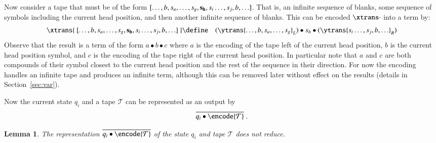 \documentclass[submission,copyright,creativecommons]{eptcs}
\newtheorem{lemma}[theorem]{Lemma}
\newcommand{\oan}[1]{\overline{#1}}
\newcommand{\tape}[1]{[#1]}
\begin{document}
Now consider a tape that must be of the form
$\tape{\ldots,b,s_a,\ldots,s_g,{\bf s_h},s_i\ldots,s_j,b,\ldots}$.
That is, an infinite sequence of blanks, some sequence of symbols including the current
head position, and then another infinite sequence of blanks.
This can be encoded $\xtrans\cdot$ into a term by:
\begin{eqnarray*}
\xtrans{\ \tape{\ldots,b,s_a,\ldots,s_g,{\bf s_h},s_i\ldots,s_j,b,\ldots}\ }
&\define&
(\ytrans{\ldots,b,s_a,\ldots,s_g}_L)\bullet s_h\bullet (\ytrans {s_i\ldots,s_j,b,\ldots}_R)
\end{eqnarray*}
{
Observe that the result is a term of the form $a\bullet b\bullet c$
where $a$ is the encoding of the tape left of the current head position,
$b$ is the current head position symbol,
and $c$ is the encoding of the tape right of the current head position.
In particular note that $a$ and $c$ are both compounds of their symbol closest
to the current head position and the rest of the sequence in their direction.
}
For now the encoding handles an infinite tape and produces an infinite term,
although this can be removed later without effect on the results (details in Section~\ref{sec:var}).


Now the current state $q_i$ and a tape ${\mathcal T}$ can be represented as an output by
\begin{equation*}
\oan {q_i\bullet \encode {\mathcal T}}\; .
\end{equation*}

\begin{lemma}
\label{lem:tape-no-red}
The representation $\oan {q_i\bullet \encode {\mathcal T}}$ of the state $q_i$
and tape ${\mathcal T}$ does not reduce.
\end{lemma}
\end{document}
